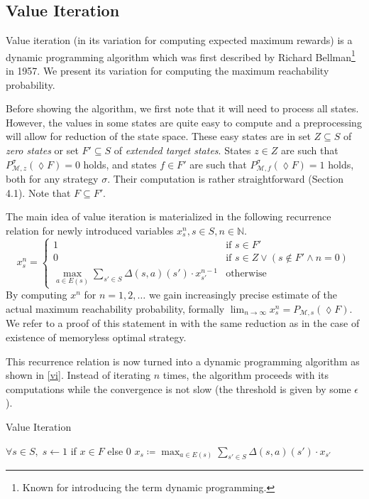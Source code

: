 \subsection*{Value Iteration}

Value iteration (in its variation for computing expected maximum rewards) is a
dynamic programming algorithm which was first described by Richard
Bellman\footnote{Known for introducing the term dynamic programming.}
\parencite{bellman} in 1957. We present its variation for computing the maximum
reachability probability.

Before showing the algorithm, we first note that it will need to
process all states. However, the values in some states are quite easy to
compute and a preprocessing will allow for reduction of the
state space.
These easy states are in set $Z \subseteq S$
of {\em zero states} or set $F' \subseteq S$ of {\em extended target states}.
States $z \in Z$ are such that $P^\sigma_{\mathcal{M},z}(\lozenge F) = 0$ holds,
and states $f \in F'$ are such that $P^\sigma_{\mathcal{M},f}(\lozenge F) = 1$
holds, both for any strategy $\sigma$.
Their computation is rather straightforward \parencite{forejt} (Section
4.1). Note that $F \subseteq F'$.

The main idea of value iteration is materialized in the following
recurrence relation for newly introduced variables $x_s^n, s \in S, n
\in \mathbb{N}$.
\[
x_s^n =
\begin{cases}
    1 & \text{if }s \in F' \\
    0 & \text{if }s \in Z \lor (s \not \in F' \land n = 0) \\
    \max\limits_{a \in E(s)} \sum\limits_{s' \in S} \Delta(s,a)(s') \cdot x_{s'}^{n-1}
    & \text{otherwise} %
\end{cases}
\]
By computing $x^n$ for $n = 1,2,\ldots$ we gain increasingly precise
estimate of the actual maximum reachability probability,
formally $\lim_{n \to \infty} x^n_s = P_{\mathcal{M},s}(\lozenge F)$.
We refer to a proof of this statement in \parencite{puterman} with the
same reduction as in the case of existence of memoryless optimal
strategy.

This recurrence relation is now turned into a dynamic programming
algorithm as shown in \autoref{vi}. Instead of iterating $n$ times, the
algorithm proceeds with its computations while the convergence is not
slow (the threshold is given by some $\epsilon$).

\begin{algorithm}
\caption{Value Iteration}
\label{vi}
\begin{algorithmic}
    \State $\forall s \in S,\; s \gets 1$ if $x \in F$ else $0$
    \Do
            \State $x_s \coloneqq
            \max_{a \in E(s)} \sum_{s' \in S} \Delta(s,a)(s') \cdot x_{s'}$
        \EndFor
\end{algorithmic}
\end{algorithm}


